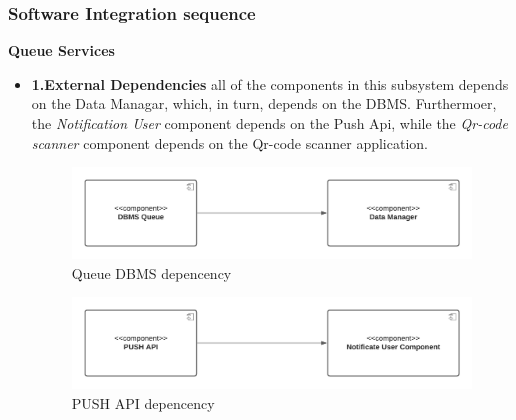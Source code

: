 \subsubsection{Software Integration sequence}
\label{subsect: softwareintegrationsequence}
\textbf{Queue Services} 
\begin{itemize}
    \item \textbf{1.External Dependencies} all of the components in this subsystem depends on the Data Managar, which, in turn, depends on the DBMS. Furthermoer, the \textit{Notification User} component depends on the Push Api, while the \textit{Qr-code scanner} component depends on the Qr-code scanner application.
    \begin{figure}[h!]
        \centering
        \includegraphics[width=.8\textwidth]{Images/TestDiagram/Queue/ExternalDepDBMS.png}
        \caption{\label{fig:QueueExternalDepDBMS}{Queue DBMS depencency}}
    \end{figure}
    \FloatBarrier  
    
    \begin{figure}[h!]
        \centering
        \includegraphics[width=.8\textwidth]{Images/TestDiagram/Queue/ExternalDepPUSH.png}
        \caption{\label{fig:QueueExternalDepPUSH}{PUSH API depencency}}
    \end{figure}
    \FloatBarrier  
    

\end{itemize}
